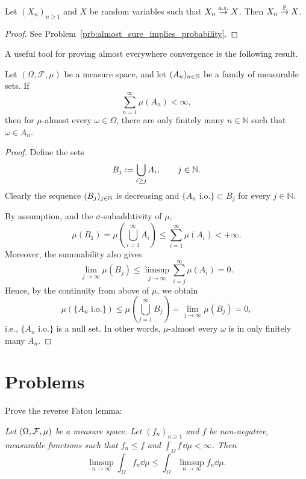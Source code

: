 \begin{lemma}\label{lem:almost_sure_implies_probability}
Let $(X_n)_{n \ge 1}$ and $X$ be random variables such that $X_n \stackrel{\mathrm{a.s.}}{\rightarrow} X$. Then $X_n \stackrel{\mathbb P}{\rightarrow} X$.
\end{lemma}

\begin{proof}
See Problem~\ref{prb:almost_sure_implies_probability}.
\end{proof}

A useful tool for proving almost everywhere convergence is the following result.

\begin{lemma}\label{lem:Borel-Cantelli}
	Let $(\Omega, \mathcal{F}, \mu)$ be a measure space, and let $(A_n)_{n\in\mathbb N}$ be a family of measurable sets. If
	\[
	\sum_{n=1}^\infty \mu(A_n) < \infty,
	\]
	then for $\mu$-almost every $\omega \in \Omega$, there are only finitely many $n \in \mathbb{N}$ such that $\omega \in A_n$.
\end{lemma}
\begin{proof}
	Define the sets
	\[
		B_j := \bigcup_{i \ge j} A_i,\qquad j\in\mathbb N.
	\]
	Clearly the sequence $(B_j)_{j\in\mathbb N}$ is decreasing and $\{A_n \text{ i.o.}\}\subset B_j$ for every $j \in \mathbb{N}$. 
	
	By assumption, and the $\sigma$-subadditivity of $\mu$,
	\[
	\mu(B_1) = \mu\left(\bigcup_{i=1}^\infty A_i \right) \leq \sum_{i=1}^\infty \mu(A_i) < +\infty.
	\]
	Moreover, the summability also gives
	\[
		\lim_{j\to\infty}\mu(B_j) \leq \limsup_{j\to\infty}\sum_{i=j}^\infty \mu(A_i) = 0.
	\]
	Hence, by the continuity from above of $\mu$, we obtain
	\[
		\mu(\{A_n \text{ i.o.}\}) \le \mu\left(\bigcup_{j=1}^\infty B_j\right) = \lim_{j\to \infty} \mu(B_j) = 0,
	\]
	i.e., $\{A_n \text{ i.o.}\}$ is a null set. In other words, $\mu$-almost every $\omega$ is in only finitely many $A_n$.
\end{proof}

\section{Problems}

\begin{problem}\label{prb:reverse_fatou}
Prove the reverse Fatou lemma:

\smallskip
\textit{
Let $(\Omega, \mathcal F, \mu)$ be a measure space. Let $(f_n)_{n \ge 1}$ and $f$ be non-negative, measurable functions such that $f_n \le f$ and $\int_\Omega f \, \dd \mu <\infty$. Then
\[
	\limsup_{n\to \infty} \int_\Omega f_n \dd \mu \le \int_\Omega \limsup_{n\to \infty} f_n \dd \mu.
\]
}
\end{problem}

